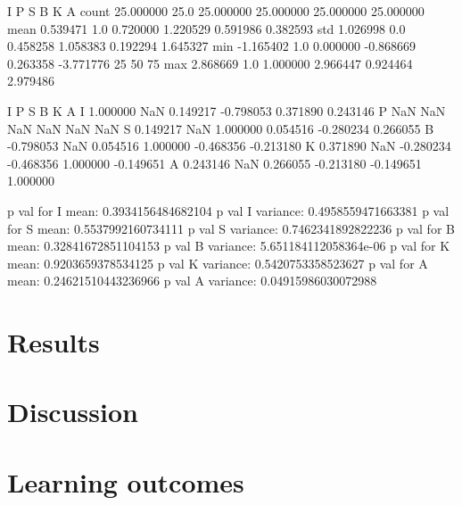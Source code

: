 \documentclass[12pt,fleqn,]{article}
\begin{document}
\begin{multicols}{2}
            I     P          S          B          K          A
count  25.000000  25.0  25.000000  25.000000  25.000000  25.000000
mean    0.539471   1.0   0.720000   1.220529   0.591986   0.382593
std     1.026998   0.0   0.458258   1.058383   0.192294   1.645327
min    -1.165402   1.0   0.000000  -0.868669   0.263358  -3.771776
25%
50%
75%
max     2.868669   1.0   1.000000   2.966447   0.924464   2.979486

          I   P         S         B         K         A
I  1.000000 NaN  0.149217 -0.798053  0.371890  0.243146
P       NaN NaN       NaN       NaN       NaN       NaN
S  0.149217 NaN  1.000000  0.054516 -0.280234  0.266055
B -0.798053 NaN  0.054516  1.000000 -0.468356 -0.213180
K  0.371890 NaN -0.280234 -0.468356  1.000000 -0.149651
A  0.243146 NaN  0.266055 -0.213180 -0.149651  1.000000

p val for I mean: 0.3934156484682104
p val I variance: 0.4958559471663381
p val for S mean: 0.5537992160734111
p val S variance: 0.7462341892822236
p val for B mean: 0.32841672851104153
p val B variance: 5.651184112058364e-06
p val for K mean: 0.9203659378534125
p val K variance: 0.5420753358523627
p val for A mean: 0.24621510443236966
p val A variance: 0.04915986030072988




\end{multicols}		

\section{Results}



\begin{multicols}{2}
	
	\section{Discussion}
	

	
	\section{Learning outcomes} 
	
\end{multicols}

\newpage
\begin{thebibliography}{9}
	

	
	
	

\end{thebibliography}
\end{document}
